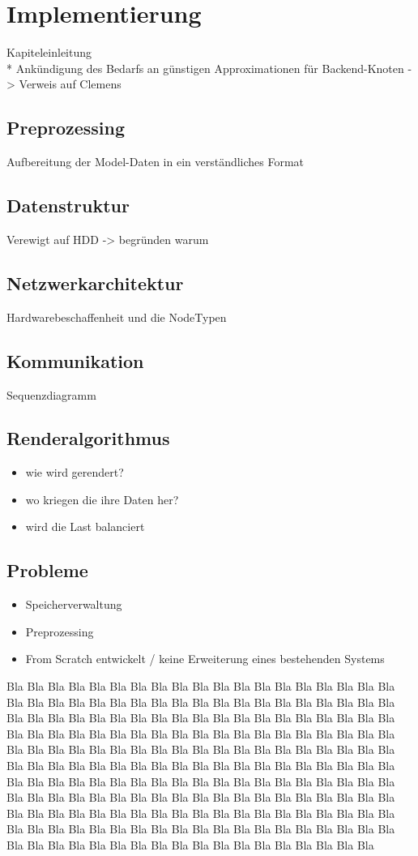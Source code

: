 
\chapter{Implementierung}
\label{implementation}
Kapiteleinleitung\\*
Ankündigung des Bedarfs an günstigen Approximationen für Backend-Knoten -> Verweis auf Clemens
\section{Preprozessing}
Aufbereitung der Model-Daten in ein verständliches Format
\section{Datenstruktur}
Verewigt auf HDD -> begründen warum
\section{Netzwerkarchitektur}
Hardwarebeschaffenheit und die NodeTypen
\section{Kommunikation}
Sequenzdiagramm
\section{Renderalgorithmus}
\begin{itemize}
 \item wie wird gerendert?
 \item wo kriegen die ihre Daten her?
 \item wird die Last balanciert
\end{itemize}
\section{Probleme}
\begin{itemize}
 \item Speicherverwaltung
 \item Preprozessing
 \item From Scratch entwickelt / keine Erweiterung eines bestehenden Systems
\end{itemize}


Bla Bla Bla Bla Bla Bla Bla Bla Bla Bla Bla Bla Bla Bla Bla Bla Bla Bla Bla Bla
Bla Bla Bla Bla Bla Bla Bla Bla Bla Bla Bla Bla Bla Bla Bla Bla Bla Bla Bla Bla
Bla Bla Bla Bla Bla Bla Bla Bla Bla Bla Bla Bla Bla Bla Bla Bla Bla Bla Bla Bla
Bla Bla Bla Bla Bla Bla Bla Bla Bla Bla Bla Bla Bla Bla Bla Bla Bla Bla Bla Bla
Bla Bla Bla Bla Bla Bla Bla Bla Bla Bla Bla Bla Bla Bla Bla Bla Bla Bla Bla Bla
Bla Bla Bla Bla Bla Bla Bla Bla Bla Bla Bla Bla Bla Bla Bla Bla Bla Bla Bla Bla
Bla Bla Bla Bla Bla Bla Bla Bla Bla Bla Bla Bla Bla Bla Bla Bla Bla Bla Bla Bla
Bla Bla Bla Bla Bla Bla Bla Bla Bla Bla Bla Bla Bla Bla Bla Bla Bla Bla Bla Bla
Bla Bla Bla Bla Bla Bla Bla Bla Bla Bla Bla Bla Bla Bla Bla Bla Bla Bla Bla Bla
Bla Bla Bla Bla Bla Bla Bla Bla Bla Bla Bla Bla Bla Bla Bla Bla Bla Bla Bla Bla
Bla Bla Bla Bla Bla Bla Bla Bla

%
%
